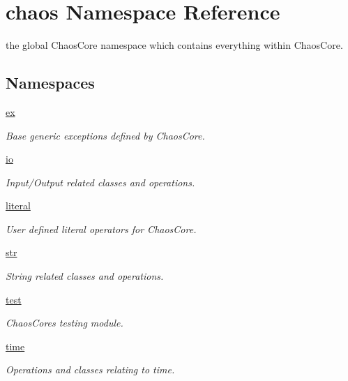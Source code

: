 \hypertarget{namespacechaos}{}\section{chaos Namespace Reference}
\label{namespacechaos}


the global Chaos\+Core namespace which contains everything within Chaos\+Core.  


\subsection*{Namespaces}
\begin{DoxyCompactItemize}
\item 
 \hyperlink{namespacechaos_1_1ex}{ex}
\begin{DoxyCompactList}\small\item\em Base generic exceptions defined by Chaos\+Core. \end{DoxyCompactList}\item 
 \hyperlink{namespacechaos_1_1io}{io}
\begin{DoxyCompactList}\small\item\em Input/\+Output related classes and operations. \end{DoxyCompactList}\item 
 \hyperlink{namespacechaos_1_1literal}{literal}
\begin{DoxyCompactList}\small\item\em User defined literal operators for Chaos\+Core. \end{DoxyCompactList}\item 
 \hyperlink{namespacechaos_1_1str}{str}
\begin{DoxyCompactList}\small\item\em String related classes and operations. \end{DoxyCompactList}\item 
 \hyperlink{namespacechaos_1_1test}{test}
\begin{DoxyCompactList}\small\item\em Chaos\+Core\textquotesingle{}s testing module. \end{DoxyCompactList}\item 
 \hyperlink{namespacechaos_1_1time}{time}
\begin{DoxyCompactList}\small\item\em Operations and classes relating to time. \end{DoxyCompactList}\end{DoxyCompactItemize}
